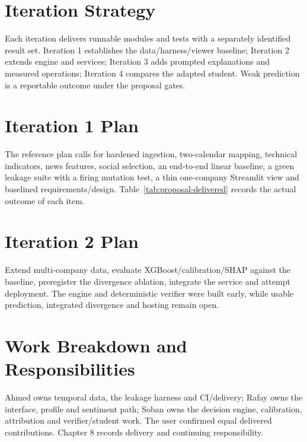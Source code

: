 \section{Iteration Strategy}
Each iteration delivers runnable modules and tests with a separately identified result set. Iteration 1 establishes the data/harness/viewer baseline; Iteration 2 extends engine and services; Iteration 3 adds prompted explanations and measured operations; Iteration 4 compares the adapted student. Weak prediction is a reportable outcome under the proposal gates.
\section{Iteration 1 Plan}
The reference plan calls for hardened ingestion, two-calendar mapping, technical indicators, news features, social selection, an end-to-end linear baseline, a green leakage suite with a firing mutation test, a thin one-company Streamlit view and baselined requirements/design. Table~\ref{tab:proposal-delivered} records the actual outcome of each item.
\section{Iteration 2 Plan}
Extend multi-company data, evaluate XGBoost/calibration/SHAP against the baseline, preregister the divergence ablation, integrate the service and attempt deployment. The engine and deterministic verifier were built early, while usable prediction, integrated divergence and hosting remain open.
\section{Work Breakdown and Responsibilities}
\label{sec:planned-work-division}
Ahmed owns temporal data, the leakage harness and CI/delivery; Rafay owns the interface, profile and sentiment path; Soban owns the decision engine, calibration, attribution and verifier/student work. The user confirmed equal delivered contributions. Chapter 8 records delivery and continuing responsibility.

